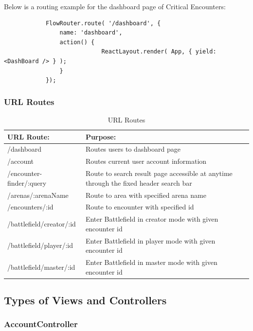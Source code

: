 \documentclass[12pt,a4paper]{report}
\begin{document}
		Below is a routing example for the dashboard page of Critical Encounters:
		
		\begin{lstlisting}
			FlowRouter.route( '/dashboard', {
				name: 'dashboard',
				action() {
							ReactLayout.render( App, { yield: <DashBoard /> } );
				}
			});
		\end{lstlisting}
		
		\subsubsection { URL Routes}
		
			\begin{table}[H]
				\begin{center}
					\begin{tabular}{ |p{5cm}|p{7cm}|| } 
						\hline
						URL Route: & Purpose: \\
						\hline
						/dashboard & Routes users to dashboard page \\
						/account & Routes current user account information\\
						/encounter-finder/:query & Route to search result page accessible at anytime through the fixed header search bar  \\
						/arenas/:arenaName & Route to area with specified arena name  \\
						/encounters/:id & Route to encounter with specified id \\
						/battlefield/creator/:id & Enter Battlefield in creator mode with given encounter id \\
						/battlefield/player/:id & Enter Battlefield in player mode with given encounter id \\
						/battlefield/master/:id & Enter Battlefield in master mode with given encounter id \\	
						\hline
					\end{tabular}
				\end{center}
			\caption{URL Routes} \label{table: URL Routes}
		\end{table}
		
		
	\subsection{Types of Views and Controllers}
		\subsubsection{AccountController}
\end{document}
